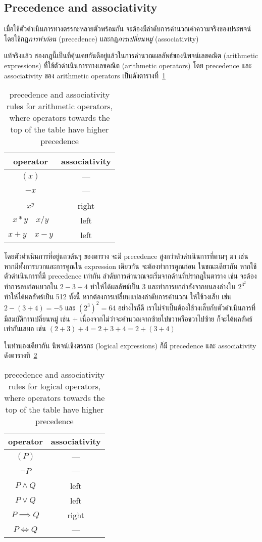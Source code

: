 \subsection{Precedence and associativity}
เมื่อใช้ตัวดำเนินการทางตรรกะหลายตัวพร้อมกัน จะต้องมีลำดับการคำนวณค่าความจริงของประพจน์ โดยใช้กฎ\emph{การทำก่อน} (precedence) และกฎ\emph{การเปลี่ยนหมู่} (associativity)

แท้จริงแล้ว สองกฎนี้เป็นที่คุ้นเคยกันดีอยู่แล้วในการคำนวณผลลัพธ์ของนิพจน์เลขคณิต (arithmetic expressions) ที่ใช้ตัวดำเนินการทางเลขคณิต (arithmetic operators) โดย precedence และ associativity ของ arithmetic operators เป็นดังตารางที่~\ref{tab:arith-prec-assoc}
%
\begin{table}
    \centering
    \begin{tabular}{c|c}
        \bf operator & \bf associativity \\\hline
        $(x)$ & --- \\
        ${-x}$ & --- \\
        $x^y$ & right \\
        $x*y \quad x/y$ & left \\
        $x+y \quad x-y$ & left
    \end{tabular}
    \caption[precedence and associativity rules for arithmetic operators]{precedence and associativity rules for arithmetic operators, where operators towards the top of the table have higher precedence}
    \label{tab:arith-prec-assoc}
\end{table}
%
โดยตัวดำเนินการที่อยู่แถวต้นๆ ของตาราง จะมี precedence สูงกว่าตัวดำเนินการที่ตามๆ มา เช่น หากมีทั้งการบวกและการคูณใน expression เดียวกัน จะต้องทำการคูณก่อน \enskip ในขณะเดียวกัน หากใช้ตัวดำเนินการที่มี precedence เท่ากัน ลำดับการคำนวณจะเริ่มจากด้านที่ปรากฏในตาราง เช่น จะต้องทำการลบก่อนบวกใน $2-3+4$ ทำให้ได้ผลลัพธ์เป็น 3 และทำการยกกำลังจากบนลงล่างใน $2^{3^2}$ ทำให้ได้ผลลัพธ์เป็น 512 \enskip ทั้งนี้ หากต้องการเปลี่ยนแปลงลำดับการคำนวณ ให้ใช้วงเล็บ เช่น $2-(3+4)=-5$ และ $(2^3)^2=64$ \enskip อย่างไรก็ดี เราไม่จำเป็นต้องใช้วงเล็บกับตัวดำเนินการที่มีสมบัติการเปลี่ยนหมู่ เช่น $+$ เนื่องจากไม่ว่าจะคำนวณจากซ้ายไปขวาหรือขวาไปซ้าย ก็จะได้ผลลัพธ์เท่ากันเสมอ เช่น $(2+3)+4=2+3+4=2+(3+4)$

ในทำนองเดียวกัน นิพจน์เชิงตรรกะ (logical expressions) ก็มี precedence และ associativity ดังตารางที่~\ref{tab:bool-prec-assoc}
%
\begin{table}
    \centering
    \begin{tabular}{c|c}
        \bf operator & \bf associativity \\\hline
        $(P)$ & --- \\
        $\neg P$ & --- \\
        $P\wedge Q$ & left \\
        $P\vee Q$ & left \\
        $P\implies Q$ & right \\
        $P\iff Q$ & ---
    \end{tabular}
    \caption[precedence and associativity rules for logical operators]{precedence and associativity rules for logical operators, where operators towards the top of the table have higher precedence}
    \label{tab:bool-prec-assoc}
\end{table}

